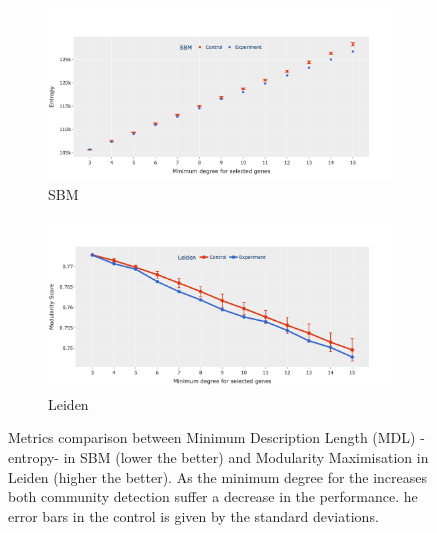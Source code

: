 \begin{figure}[!h]
    \captionsetup[subfigure]{justification=Centering}
    \begin{subfigure}[!t]{0.5\textwidth}
        \includegraphics[width=\textwidth]{Sections/Network_I/Resources/selective_pruning/sbm_ent_sel_prun.png}
        \caption{SBM}
        \label{fig:N_I:sbm_com_det_met}
    \end{subfigure}\hspace{\fill} %
    \begin{subfigure}[!t]{0.5\textwidth}
        \includegraphics[width=\linewidth]{Sections/Network_I/Resources/selective_pruning/leid_mod_sel_prun.png}
        \caption{Leiden}
            \label{fig:N_I:leid_com_det_met}
    \end{subfigure}\hspace{\fill} %

    \caption{Metrics comparison between Minimum Description Length (MDL) - entropy- in SBM (lower the better) and Modularity Maximisation in Leiden (higher the better). As the minimum degree for the increases both community detection suffer a decrease in the performance. he error bars in the control is given by the standard deviations.}
    \label{fig:N_I:com_det_met}
\end{figure}

